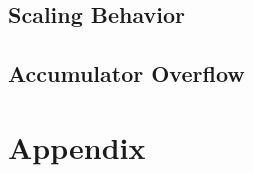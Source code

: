 \documentclass[a4paper,11pt]{article}
\begin{document}
\subsection{Scaling Behavior}




\subsection{Accumulator Overflow}





\section{Appendix}
















\end{document}
